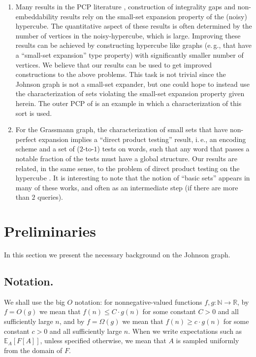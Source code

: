\documentclass[11pt]{article}
\newcommand{\R}{{\mathbb R}}
\newcommand{\ie}{i.\,e.}
\newcommand{\eg}{e.\,g.}
\newcommand{\N}{{\mathbb N}}
\newcommand\E{\mathbb{E}}
\renewcommand\geq{\geqslant}
\renewcommand\leq{\leqslant}
\begin{document}
\begin{enumerate}
   \item Many results in the PCP literature \cite{Has01}, construction of integrality gaps and non-embeddability results \cite{KhotVishnoi,KN}
  rely on the small-set expansion property of the (noisy) hypercube. The quantitative aspect of these results is often determined by the number
  of vertices in the noisy-hypercube, which is large. Improving
  these results can be achieved by constructing hypercube like graphs (\eg, that have a ``small-set expansion'' type property) with significantly
  smaller number of vertices. We believe that our results can be used to get improved constructions to the above problems. This task is not trivial since
  the Johnson graph %
  is not a small-set expander, but one could hope to instead use the characterization of sets violating the small-set expansion property
  given herein. The outer PCP of \cite{KMS,DKKMSgras} is an example in which a characterization of this sort is used.

  \item For the Grassmann graph, the characterization of small sets that have non-perfect expansion implies a ``direct product testing'' result,
  \ie, an encoding scheme and a set of ($2$-to-$1$) tests on words, such that any word that passes a notable fraction of the tests must have a global structure.
  Our results are related, in the same sense, to the problem of direct product testing on the hypercube \cite{IKW12,DN17,DDGKS17}.
  It is interesting to note that the notion of ``basic sets'' appears in many of these works, and often as an intermediate step (if there
  are more than $2$ queries).
\end{enumerate}


\section{Preliminaries}
In this section we present the necessary background on the Johnson graph.

%
%
\subsection{Notation.}   %
We shall use
the  %
big $O$ %
notation:   %
for nonnegative-valued functions $f,g: \N \to \R$,
by $f = O(g)$ we mean that %
$f(n)\leq C\cdot g(n)$  %
for some %
%
constant $C>0$
 and all sufficiently large $n$, %
and by $f=\Omega(g)$ we mean that %
$f(n) \geq c\cdot g(n)$   %
for some %
constant $c>0$   %
and all sufficiently large $n$.  %
When we write expectations such as $\E_A[F[A]]$, unless specified otherwise, we mean that $A$ is sampled uniformly
from the domain of $F$.%
%
%
%
%
%
%
%
%
\end{document}
